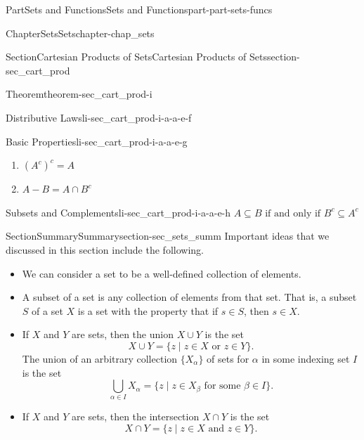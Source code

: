 \documentclass[oneside,10pt,]{book}
\numberwithin{equation}{chapter}
\begin{document}
\begin{partptx}{Part}{Sets and Functions}{}{Sets and Functions}{}{}{part-part-sets-funcs}
\begin{chapterptx}{Chapter}{Sets}{}{Sets}{}{}{chapter-chap_sets}
\begin{sectionptx}{Section}{Cartesian Products of Sets}{}{Cartesian Products of Sets}{}{}{section-sec_cart_prod}
\begin{theorem}{Theorem}{}{}{theorem-sec_cart_prod-i}
\begin{descriptionlist}
\begin{dlinarrow}{Distributive Laws}{li-sec_cart_prod-i-a-a-e-f}
\begin{enumerate}[label=\roman*]
\end{enumerate}
%
\end{dlinarrow}%
\begin{dlinarrow}{Basic Properties}{li-sec_cart_prod-i-a-a-e-g}%
%
\begin{enumerate}[label=\roman*]
\item{}\(\displaystyle \left(A^c\right)^c = A\)%
\item{}\(\displaystyle A - B = A \cap B^c\)%
\end{enumerate}
%
\end{dlinarrow}%
\begin{dlinarrow}{Subsets and Complements}{li-sec_cart_prod-i-a-a-e-h}%
\(\displaystyle A \subseteq B \text{ if and only if } B^c \subseteq A^c\)%
\end{dlinarrow}%
\end{descriptionlist}
%
\end{theorem}
\end{sectionptx}
%
%
\typeout{************************************************}
\typeout{************************************************}
%
\begin{sectionptx}{Section}{Summary}{}{Summary}{}{}{section-sec_sets_summ}
Important ideas that we discussed in this section include the following.%
\begin{itemize}[label=\textbullet]
\item{}We can consider a set to be a well-defined collection of elements.%
\item{}A subset of a set is any collection of elements from that set. That is, a subset \(S\) of a set \(X\) is a set with the property that if \(s \in S\), then \(s \in X\).%
\item{}If \(X\) and \(Y\) are sets, then the union \(X \cup Y\) is the set%
\begin{equation*}
X \cup Y = \{z \mid z \in X \text{ or }  z \in Y\}\text{.}
\end{equation*}
The union of an arbitrary collection \(\{X_{\alpha}\}\) of sets for \(\alpha\) in some indexing set \(I\) is the set%
\begin{equation*}
\bigcup_{\alpha \in I} X_{\alpha} = \{z \mid z \in X_{\beta} \text{ for some }  \beta \in I\}\text{.}
\end{equation*}
%
\item{}If \(X\) and \(Y\) are sets, then the intersection \(X \cap Y\) is the set%
\begin{equation*}
X \cap Y = \{z \mid z \in X \text{ and }  z \in Y\}\text{.}

\end{equation*}
\end{itemize}
\end{sectionptx}
\end{chapterptx}
\end{partptx}
\end{document}
